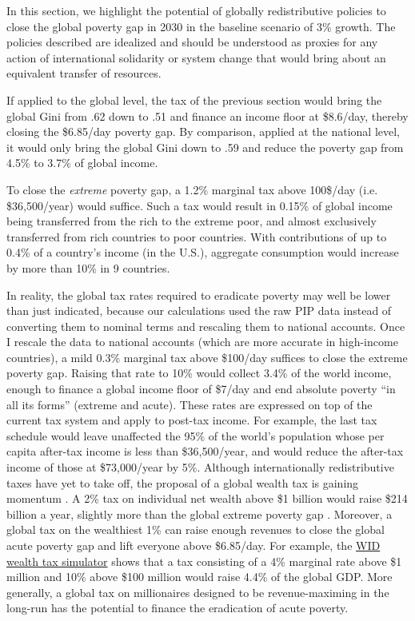 \documentclass[12pt,english]{article}
\begin{document}
In this section, we highlight the potential of globally redistributive policies to close the global poverty gap in 2030 in the baseline scenario of 3\% growth. The policies described are idealized and should be understood as proxies for any action of international solidarity or system change that would bring about an equivalent transfer of resources. %

If applied to the global level, the tax of the previous section would bring the global Gini from .62 down to .51 and finance an income floor at \$8.6/day, thereby closing the \$6.85/day poverty gap. By comparison, applied at the national level, it would only bring the global Gini down to .59 and reduce the poverty gap from 4.5\% to 3.7\% of global income. 

To close the \textit{extreme} poverty gap, a 1.2\% marginal tax %
above 100\$/day (i.e. \$36,500/year) would suffice. %
Such a tax would result in 0.15\% of global income being transferred from the rich to the extreme poor, and almost exclusively transferred from rich countries to poor countries. 
With contributions of up to 0.4\% of a country's income (in the U.S.), aggregate consumption would increase by more than 10\% in 9 countries. 

In reality, the global tax rates required to eradicate poverty may well be lower than just indicated, because our calculations used the raw PIP data instead of converting them to nominal terms and rescaling them to national accounts. Once I rescale the data to national accounts (which are more accurate in high-income countries), %
a mild 0.3\% marginal tax above \$100/day suffices to close the extreme poverty gap. Raising that rate to 10\% would collect 3.4\% of the world income, enough to finance a global income floor of \$7/day and end absolute poverty ``in all its forms'' (extreme and acute). %
These rates are expressed on top of the current tax system and apply to post-tax income. For example, the last tax schedule would leave unaffected the 95\% of the world's population whose per capita after-tax income is less than \$36,500/year, and would reduce the after-tax income of those at \$73,000/year by 5\%. 
Although internationally redistributive taxes have yet to take off, the proposal of a global wealth tax is gaining momentum \citep{piketty_brief_2022}. A 2\% tax on individual net wealth above \$1 billion would raise \$214 billion a year, slightly more than the global extreme poverty gap \citep{alstadsaeter_global_2024}. Moreover, a global tax on the wealthiest 1\% can raise enough revenues to close the global acute poverty gap and lift everyone above \$6.85/day. For example, the \href{https://wid.world/world-wealth-tax-simulator}{WID wealth tax simulator} shows that a tax consisting of a 4\% marginal rate above \$1 million and 10\% above \$100 million would raise 4.4\% of the global GDP. More generally, a global tax on millionaires designed to be revenue-maximing in the long-run has the potential to finance the eradication of acute poverty. 
\end{document}
